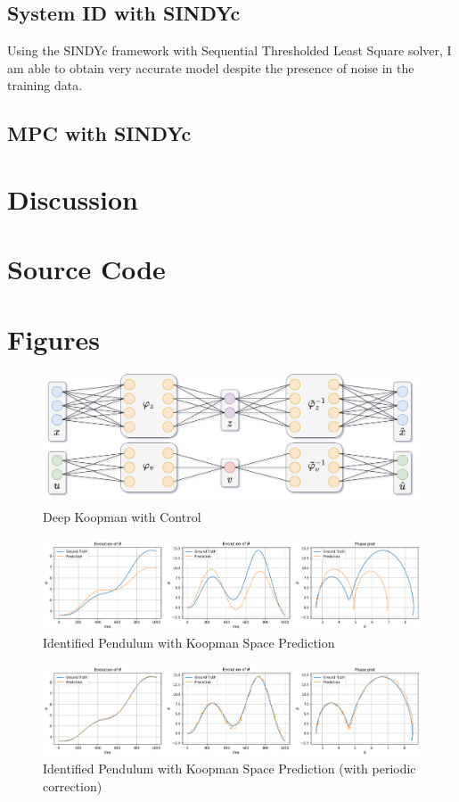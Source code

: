 \documentclass[10pt,twocolumn]{article}
\begin{document}
\subsection{System ID with SINDYc}

Using the SINDYc framework with Sequential Thresholded Least Square solver, I am able to obtain
very accurate model despite the presence of noise in the training data.

\subsection{MPC with SINDYc}

\section{Discussion}

\newpage



\newpage
\onecolumn
\appendix
\appendixpage
\section{Source Code}
\section{Figures}

\begin{figure}[htb!]
  \centering
  \includegraphics[width=.9\textwidth]{koopman_arch}
  \caption{Deep Koopman with Control}
  \label{fig:koopman_arch}
\end{figure}

\begin{figure}[htb!]
  \centering
  \includegraphics[width=\textwidth]{koopman_predict}
  \caption{Identified Pendulum with Koopman Space Prediction}
  \label{fig:koopman_predict}
\end{figure}

\begin{figure}[htb!]
  \centering
  \includegraphics[width=\textwidth]{koopman_correct}
  \caption{Identified Pendulum with Koopman Space Prediction (with periodic correction)}
  \label{fig:koopman_correct}
\end{figure}
\end{document}
